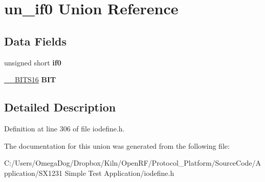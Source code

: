 \hypertarget{unionun__if0}{\section{un\-\_\-if0 Union Reference}
\label{unionun__if0}
}
\subsection*{Data Fields}
\begin{DoxyCompactItemize}
\item 
\hypertarget{unionun__if0_a00b444b787a91773d168040738660185}{unsigned short {\bfseries if0}}\label{unionun__if0_a00b444b787a91773d168040738660185}

\item 
\hypertarget{unionun__if0_ad21bd06fa67ed75a79048008c149a026}{\hyperlink{struct_____b_i_t_s16}{\-\_\-\-\_\-\-B\-I\-T\-S16} {\bfseries B\-I\-T}}\label{unionun__if0_ad21bd06fa67ed75a79048008c149a026}

\end{DoxyCompactItemize}


\subsection{Detailed Description}


Definition at line 306 of file iodefine.\-h.



The documentation for this union was generated from the following file\-:\begin{DoxyCompactItemize}
\item 
C\-:/\-Users/\-Omega\-Dog/\-Dropbox/\-Kiln/\-Open\-R\-F/\-Protocol\-\_\-\-Platform/\-Source\-Code/\-Application/\-S\-X1231 Simple Test Application/iodefine.\-h\end{DoxyCompactItemize}
